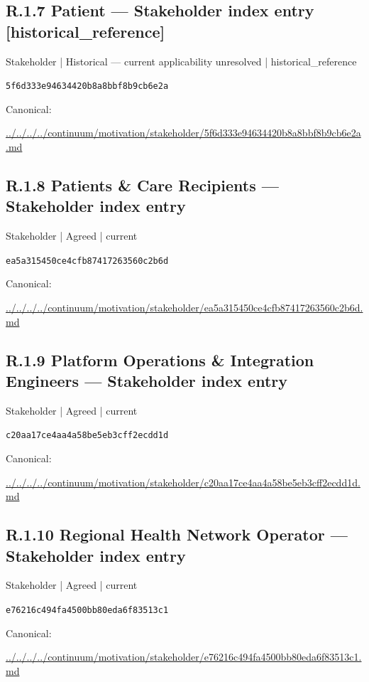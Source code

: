 \documentclass[10pt,a4paper]{article}
\begin{document}
\subsection*{R.1.7 Patient — Stakeholder index entry [historical\_reference]}
\label{element-5f6d333e94634420b8a8bbf8b9cb6e2a}
{\small Stakeholder | Historical — current applicability unresolved | historical\_reference}\par
\texttt{5f6d333e94634420b8a8bbf8b9cb6e2a}\par
Canonical: \par
{\footnotesize\url{../../../../continuum/motivation/stakeholder/5f6d333e94634420b8a8bbf8b9cb6e2a.md}}\par
\subsection*{R.1.8 Patients \& Care Recipients — Stakeholder index entry}
\label{element-ea5a315450ce4cfb87417263560c2b6d}
{\small Stakeholder | Agreed | current}\par
\texttt{ea5a315450ce4cfb87417263560c2b6d}\par
Canonical: \par
{\footnotesize\url{../../../../continuum/motivation/stakeholder/ea5a315450ce4cfb87417263560c2b6d.md}}\par
\subsection*{R.1.9 Platform Operations \& Integration Engineers — Stakeholder index entry}
\label{element-c20aa17ce4aa4a58be5eb3cff2ecdd1d}
{\small Stakeholder | Agreed | current}\par
\texttt{c20aa17ce4aa4a58be5eb3cff2ecdd1d}\par
Canonical: \par
{\footnotesize\url{../../../../continuum/motivation/stakeholder/c20aa17ce4aa4a58be5eb3cff2ecdd1d.md}}\par
\subsection*{R.1.10 Regional Health Network Operator — Stakeholder index entry}
\label{element-e76216c494fa4500bb80eda6f83513c1}
{\small Stakeholder | Agreed | current}\par
\texttt{e76216c494fa4500bb80eda6f83513c1}\par
Canonical: \par
{\footnotesize\url{../../../../continuum/motivation/stakeholder/e76216c494fa4500bb80eda6f83513c1.md}}\par
\end{document}
